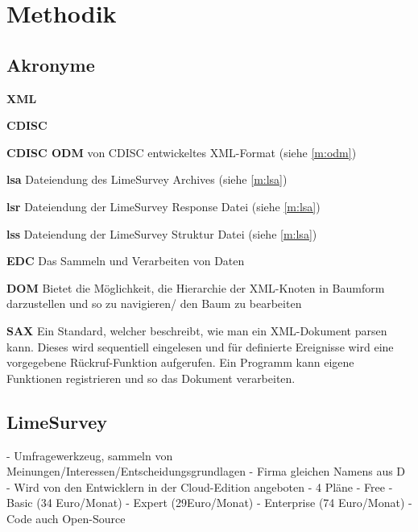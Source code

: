 \chapter{Methodik}
\label{ch:methodik}

\section{Akronyme}

\begin{description}[font=\sffamily\bfseries, leftmargin=0cm, itemsep=-0.15cm, style=nextline]
	\item \textbf{XML} 
	\item \textbf{CDISC} 
	\item \textbf{CDISC ODM}  von CDISC entwickeltes XML-Format (siehe \cref{m:odm})
	\item \textbf{lsa} Dateiendung des LimeSurvey Archives (siehe \cref{m:lsa})
	\item \textbf{lsr} Dateiendung der LimeSurvey Response Datei (siehe \cref{m:lsa})
	\item \textbf{lss} Dateiendung der LimeSurvey Struktur Datei (siehe \cref{m:lsa})
	\item \textbf{EDC}  Das Sammeln und Verarbeiten von Daten
	\item \textbf{DOM}  Bietet die Möglichkeit, die Hierarchie der XML-Knoten in Baumform darzustellen und so zu navigieren/ den Baum zu bearbeiten
	\item \textbf{SAX}  Ein Standard, welcher beschreibt, wie man ein XML-Dokument parsen kann. Dieses wird sequentiell eingelesen und für definierte Ereignisse wird eine vorgegebene Rückruf-Funktion aufgerufen. Ein Programm kann eigene Funktionen registrieren und so das Dokument verarbeiten.
\end{description}

\section{LimeSurvey}

- Umfragewerkzeug, sammeln von Meinungen/Interessen/Entscheidungsgrundlagen
- Firma gleichen Namens aus D
- Wird von den Entwicklern in der Cloud-Edition angeboten
- 4 Pläne
	- Free
	- Basic (34 Euro/Monat)
	- Expert (29Euro/Monat)
	- Enterprise (74 Euro/Monat)
- Code auch Open-Source

